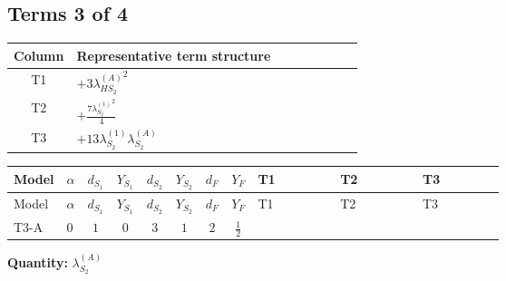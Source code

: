 \documentclass[8pt]{article}
\begin{document}
\begin{landscape}
\subsection*{Terms 3 of 4}
\begin{center}
\begin{tabular}{@{}c >{\raggedright\arraybackslash}p{0.82\linewidth}@{}}
\toprule
Column & Representative term structure \\
\midrule
T1 & \(\displaystyle +3 {\lambda_{HS_2}^{(A)}}^2\) \\
\midrule
T2 & \(\displaystyle +\frac{7 {\lambda_{S_2}^{(1)}}^2}{4}\) \\
\midrule
T3 & \(\displaystyle +13 {\lambda_{S_2}^{(1)}} {\lambda_{S_2}^{(A)}}\) \\
\midrule
\bottomrule
\end{tabular}
\end{center}
\smallskip
\tiny
\begin{longtable}{@{}llcccccc >{\raggedright\arraybackslash}p{0.21\linewidth} >{\raggedright\arraybackslash}p{0.21\linewidth} >{\raggedright\arraybackslash}p{0.21\linewidth}@{}}
\toprule
Model & $\alpha$ & $d_{S_1}$ & $Y_{S_1}$ & $d_{S_2}$ & $Y_{S_2}$ & $d_F$ & $Y_F$ & T1 & T2 & T3 \\
\midrule
\endfirsthead
\toprule
Model & $\alpha$ & $d_{S_1}$ & $Y_{S_1}$ & $d_{S_2}$ & $Y_{S_2}$ & $d_F$ & $Y_F$ & T1 & T2 & T3 \\
\midrule
\endhead
T3-A & $0$ & $1$ & $0$ & $3$ & $1$ & $2$ & $\frac{1}{2}$ & \scriptsize\adjustbox{max width=\linewidth}{$\begin{gathered} +3 {\lambda_{HS_2}^{(A)}}^2\end{gathered}$} & \scriptsize\adjustbox{max width=\linewidth}{$\begin{gathered} +\frac{7 {\lambda_{S_2}^{(1)}}^2}{4}\end{gathered}$} & \scriptsize\adjustbox{max width=\linewidth}{$\begin{gathered} +13 {\lambda_{S_2}^{(1)}} {\lambda_{S_2}^{(A)}}\end{gathered}$} \\
\midrule
\bottomrule
\end{longtable}
\clearpage
\noindent\textbf{Quantity: }$\lambda_{S_2}^{(A)}$\par\smallskip

\end{landscape}
\end{document}

